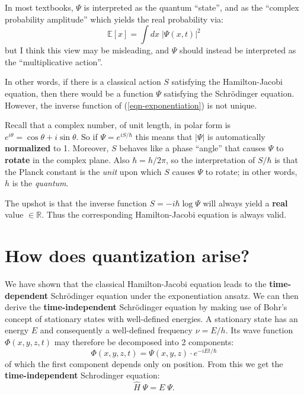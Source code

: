 In most textbooks, $\Psi$ is interpreted as the quantum ``state'', and as the ``complex probability amplitude'' which yields the real probability via:
\begin{equation}
\mathbb{E} [ x ] = \int dx \; | \Psi(x, t) |^2 
\end{equation}
but I think this view may be misleading, and $\Psi$ should instead be interpreted as the ``multiplicative action''.

In other words, if there is a classical action $S$ satisfying the Hamilton-Jacobi equation, then there would be a function $\Psi$ satisfying the Schr\"odinger equation.  However, the inverse function of (\ref{eqn-exponentiation}) is not unique.

Recall that a complex number, of unit length, in polar form is $e^{i \theta} = \cos \theta + i \sin \theta$.  So if $\Psi = e^{i S / \hbar}$ this means that $| \Psi |$ is automatically \textbf{normalized} to 1.  Moreover, $S$ behaves like a phase ``angle'' that causes $\Psi$ to \textbf{rotate} in the complex plane.  Also $\hbar = h / 2 \pi$, so the interpretation of $S / \hbar$ is that the Planck constant is the \textit{unit} upon which $S$ causes $\Psi$ to rotate;  in other words, $h$ is the \textit{quantum}.

The upshot is that the inverse function $S = - i \hbar \log \Psi$ will always yield a \textbf{real} value $\in \mathbb{R}$.  Thus the corresponding Hamilton-Jacobi equation is always valid.

\section{How does quantization arise?}

We have shown that the classical Hamilton-Jacobi equation leads to the \textbf{time-dependent} Schr\"odinger equation under the exponentiation ansatz.  We can then derive the \textbf{time-indepen\allowbreak dent} Schr\"odinger equation by making use of Bohr's concept of stationary states with well-defined energies. A stationary state has an energy $E$ and consequently a well-defined frequency $\nu = E / h$.  Its wave function $\Phi (x, y, z, t)$ may therefore be decomposed into 2 components:
\begin{equation}
\Phi (x, y, z, t) = \Psi (x, y, z) \cdot e^{-i E t / \hbar}
\end{equation}
of which the first component depends only on position.  From this we get the \textbf{time-indepen\allowbreak dent} Schrodinger equation:
\begin{equation}
\hat{H} \; \Psi = E \; \Psi .
\label{time-independent-Schrodinger}
\end{equation}

